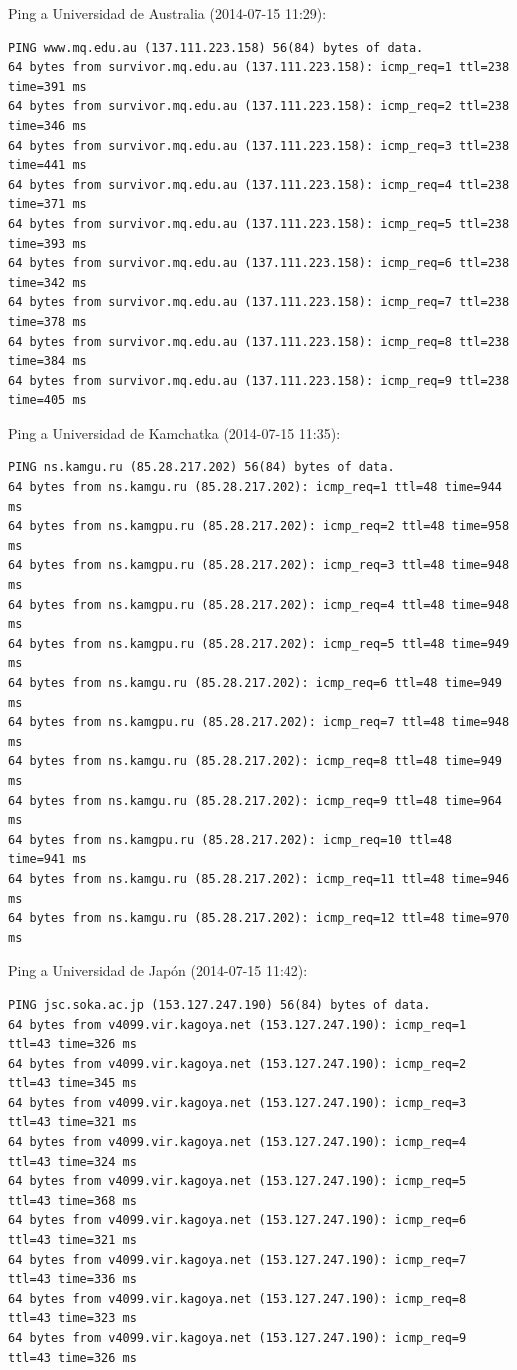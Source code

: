 Ping a Universidad de Australia (2014-07-15 11:29):
\begin{verbatim}
PING www.mq.edu.au (137.111.223.158) 56(84) bytes of data.
64 bytes from survivor.mq.edu.au (137.111.223.158): icmp_req=1 ttl=238 time=391 ms
64 bytes from survivor.mq.edu.au (137.111.223.158): icmp_req=2 ttl=238 time=346 ms
64 bytes from survivor.mq.edu.au (137.111.223.158): icmp_req=3 ttl=238 time=441 ms
64 bytes from survivor.mq.edu.au (137.111.223.158): icmp_req=4 ttl=238 time=371 ms
64 bytes from survivor.mq.edu.au (137.111.223.158): icmp_req=5 ttl=238 time=393 ms
64 bytes from survivor.mq.edu.au (137.111.223.158): icmp_req=6 ttl=238 time=342 ms
64 bytes from survivor.mq.edu.au (137.111.223.158): icmp_req=7 ttl=238 time=378 ms
64 bytes from survivor.mq.edu.au (137.111.223.158): icmp_req=8 ttl=238 time=384 ms
64 bytes from survivor.mq.edu.au (137.111.223.158): icmp_req=9 ttl=238 time=405 ms

\end{verbatim}

Ping a Universidad de Kamchatka (2014-07-15 11:35):

\begin{verbatim}
PING ns.kamgu.ru (85.28.217.202) 56(84) bytes of data.
64 bytes from ns.kamgu.ru (85.28.217.202): icmp_req=1 ttl=48 time=944 ms
64 bytes from ns.kamgpu.ru (85.28.217.202): icmp_req=2 ttl=48 time=958 ms
64 bytes from ns.kamgpu.ru (85.28.217.202): icmp_req=3 ttl=48 time=948 ms
64 bytes from ns.kamgpu.ru (85.28.217.202): icmp_req=4 ttl=48 time=948 ms
64 bytes from ns.kamgpu.ru (85.28.217.202): icmp_req=5 ttl=48 time=949 ms
64 bytes from ns.kamgu.ru (85.28.217.202): icmp_req=6 ttl=48 time=949 ms
64 bytes from ns.kamgpu.ru (85.28.217.202): icmp_req=7 ttl=48 time=948 ms
64 bytes from ns.kamgu.ru (85.28.217.202): icmp_req=8 ttl=48 time=949 ms
64 bytes from ns.kamgu.ru (85.28.217.202): icmp_req=9 ttl=48 time=964 ms
64 bytes from ns.kamgpu.ru (85.28.217.202): icmp_req=10 ttl=48 time=941 ms
64 bytes from ns.kamgu.ru (85.28.217.202): icmp_req=11 ttl=48 time=946 ms
64 bytes from ns.kamgu.ru (85.28.217.202): icmp_req=12 ttl=48 time=970 ms
\end{verbatim}

Ping a Universidad de Japón (2014-07-15 11:42):

\begin{verbatim}
PING jsc.soka.ac.jp (153.127.247.190) 56(84) bytes of data.
64 bytes from v4099.vir.kagoya.net (153.127.247.190): icmp_req=1 ttl=43 time=326 ms
64 bytes from v4099.vir.kagoya.net (153.127.247.190): icmp_req=2 ttl=43 time=345 ms
64 bytes from v4099.vir.kagoya.net (153.127.247.190): icmp_req=3 ttl=43 time=321 ms
64 bytes from v4099.vir.kagoya.net (153.127.247.190): icmp_req=4 ttl=43 time=324 ms
64 bytes from v4099.vir.kagoya.net (153.127.247.190): icmp_req=5 ttl=43 time=368 ms
64 bytes from v4099.vir.kagoya.net (153.127.247.190): icmp_req=6 ttl=43 time=321 ms
64 bytes from v4099.vir.kagoya.net (153.127.247.190): icmp_req=7 ttl=43 time=336 ms
64 bytes from v4099.vir.kagoya.net (153.127.247.190): icmp_req=8 ttl=43 time=323 ms
64 bytes from v4099.vir.kagoya.net (153.127.247.190): icmp_req=9 ttl=43 time=326 ms
\end{verbatim}

